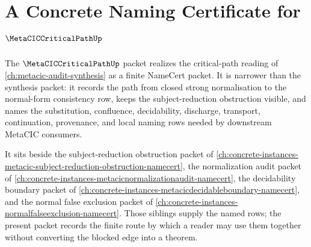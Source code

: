 \chapter{A Concrete Naming Certificate for $\MetaCICCriticalPathUp$}
\label{ch:concrete-instances-metaciccriticalpath-namecert}

The $\MetaCICCriticalPathUp$ packet realizes the critical-path reading of \autoref{ch:metacic-audit-synthesis} as a finite NameCert packet. It is narrower than the synthesis packet: it records the path from closed strong normalisation to the normal-form consistency row, keeps the subject-reduction obstruction visible, and names the substitution, confluence, decidability, discharge, transport, continuation, provenance, and local naming rows needed by downstream MetaCIC consumers.

It sits beside the subject-reduction obstruction packet of \autoref{ch:concrete-instances-metacic-subject-reduction-obstruction-namecert}, the normalization audit packet of \autoref{ch:concrete-instances-metacicnormalizationaudit-namecert}, the decidability boundary packet of \autoref{ch:concrete-instances-metacicdecidableboundary-namecert}, and the normal false exclusion packet of \autoref{ch:concrete-instances-normalfalseexclusion-namecert}. Those siblings supply the named rows; the present packet records the finite route by which a reader may use them together without converting the blocked edge into a theorem.

